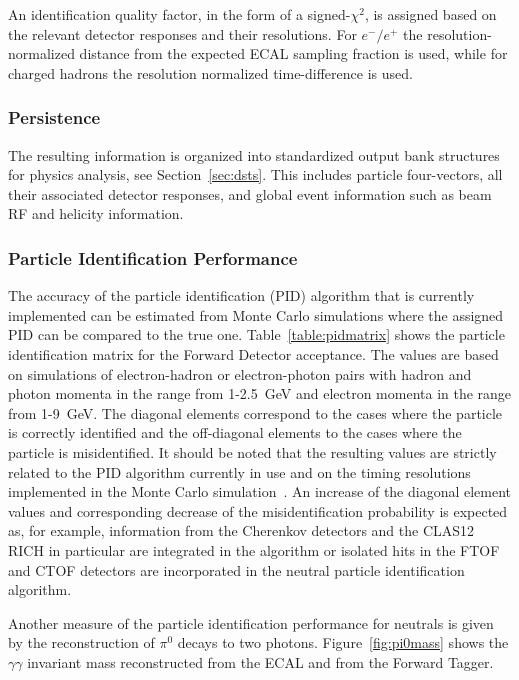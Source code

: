 An identification quality factor, in the form of a signed-$\chi^2$, is assigned based on the relevant detector
responses and their resolutions. For $e^-/e^+$ the resolution-normalized distance from the expected ECAL
sampling fraction is used, while for charged hadrons the resolution normalized time-difference is used.

\subsubsection{Persistence}

The resulting information is organized into standardized output bank structures for physics analysis, see
Section~\ref{sec:dsts}. This includes particle four-vectors, all their associated detector responses, and global
event information such as beam RF and helicity information.

\subsubsection{Particle Identification Performance}

The accuracy of the particle identification (PID) algorithm that is currently implemented can be estimated from
Monte Carlo simulations where the assigned PID can be compared to the true one. Table~\ref{table:pidmatrix}
shows the particle identification matrix for the Forward Detector acceptance. The values are based on simulations of
electron-hadron or electron-photon pairs with hadron and photon momenta in the range from 1-2.5~GeV and electron
momenta in the range from 1-9~GeV. The diagonal elements correspond to the cases where the particle is correctly
identified and the off-diagonal elements to the cases where the particle is misidentified. It should be noted that the
resulting values are strictly related to the PID algorithm currently in use and on the timing resolutions implemented
in the Monte Carlo simulation~\cite{sim-nim}. An increase of the diagonal element values and corresponding decrease
of the misidentification probability is expected as, for example, information from the Cherenkov detectors and the
CLAS12 RICH in particular are integrated in the algorithm or isolated hits in the FTOF and CTOF detectors are
incorporated in the neutral particle identification algorithm.

Another measure of the particle identification performance for neutrals is given by the reconstruction of $\pi^0$
decays to two photons. Figure~\ref{fig:pi0mass} shows the $\gamma \gamma$ invariant mass reconstructed from
the ECAL and from the Forward Tagger.

